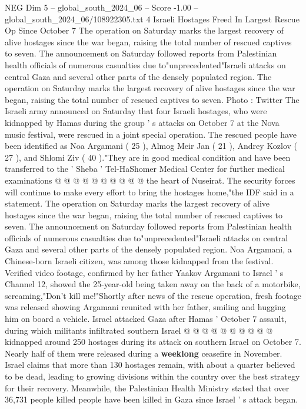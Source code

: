 \begin{textsample}{NEG Dim 5 – global\_south\_2024\_06 – Score -1.00 – global\_south\_2024\_06/108922305.txt}  \label{ex:f5_neg_221}
4 Israeli Hostages Freed In Largest Rescue Op Since October 7 The operation on Saturday marks the largest recovery of alive hostages since the war began, raising the total number of rescued captives to seven.
The announcement on Saturday followed reports from Palestinian health officials of numerous casualties due to"unprecedented"Israeli attacks on central Gaza and several other parts of the densely populated region.
The operation on Saturday marks the largest recovery of alive hostages since the war began, raising the total number of rescued captives to seven.
Photo : Twitter The Israeli army announced on Saturday that four Israeli hostages, who were kidnapped by Hamas during the group ' s attacks on October 7 at the Nova music festival, were rescued in a joint special operation.
The rescued people have been identified as Noa Argamani ( 25 ), Almog Meir Jan ( 21 ), Andrey Kozlov ( 27 ), and Shlomi Ziv ( 40 )."They are in good medical condition and have been transferred to the ' Sheba ' Tel-HaShomer Medical Center for further medical examinations @ @ @ @ @ @ @ @ @ @ the heart of Nuseirat.
The security forces will continue to make every effort to bring the hostages home,"the IDF said in a statement.
The operation on Saturday marks the largest recovery of alive hostages since the war began, raising the total number of rescued captives to seven.
The announcement on Saturday followed reports from Palestinian health officials of numerous casualties due to"unprecedented"Israeli attacks on central Gaza and several other parts of the densely populated region.
Noa Argamani, a Chinese-born Israeli citizen, was among those kidnapped from the festival.
Verified video footage, confirmed by her father Yaakov Argamani to Israel ' s Channel 12, showed the 25-year-old being taken away on the back of a motorbike, screaming,"Don't kill me!"Shortly after news of the rescue operation, fresh footage was released showing Argamani reunited with her father, smiling and hugging him on board a vehicle.
Israel attacked Gaza after Hamas ' October 7 assault, during which militants infiltrated southern Israel @ @ @ @ @ @ @ @ @ @ kidnapped around 250 hostages during its attack on southern Israel on October 7.
Nearly half of them were released during a \textbf{weeklong} ceasefire in November.
Israel claims that more than 130 hostages remain, with about a quarter believed to be dead, leading to growing divisions within the country over the best strategy for their recovery.
Meanwhile, the Palestinian Health Ministry stated that over 36,731 people killed people have been killed in Gaza since Israel ' s attack began.

\end{textsample}
